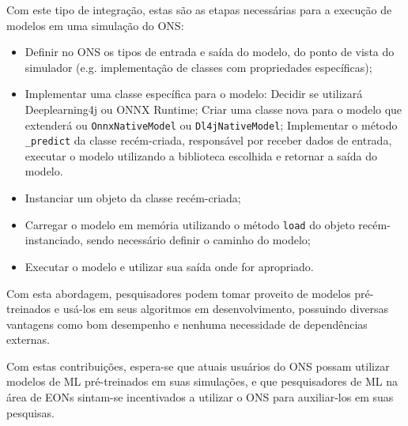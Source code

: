 Com este tipo de integração, estas são as etapas necessárias para a execução de modelos em uma simulação do ONS:

\begin{itemize}
  \item Definir no ONS os tipos de entrada e saída do modelo, do ponto de vista do simulador (e.g. implementação de classes com propriedades específicas);
  \item Implementar uma classe específica para o modelo:
        \subitem Decidir se utilizará Deeplearning4j ou ONNX Runtime;
        \subitem Criar uma classe nova para o modelo que extenderá ou \texttt{OnnxNativeModel} ou \texttt{Dl4jNativeModel};
        \subitem Implementar o método \texttt{\_predict} da classe recém-criada, responsável por receber dados de entrada, executar o modelo utilizando a biblioteca escolhida e retornar a saída do modelo.
  \item Instanciar um objeto da classe recém-criada;
  \item Carregar o modelo em memória utilizando o método \texttt{load} do objeto recém-instanciado, sendo necessário definir o caminho do modelo;
  \item Executar o modelo e utilizar sua saída onde for apropriado.
\end{itemize}

Com esta abordagem, pesquisadores podem tomar proveito de modelos pré-treinados e usá-los em seus algoritmos em desenvolvimento, possuindo diversas vantagens como bom desempenho e nenhuma necessidade de dependências externas.

Com estas contribuições, espera-se que atuais usuários do ONS possam utilizar modelos de ML pré-treinados em suas simulações, e que pesquisadores de ML na área de EONs sintam-se incentivados a utilizar o ONS para auxiliar-los em suas pesquisas.
